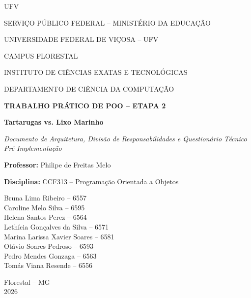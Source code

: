 \documentclass[11pt,a4paper]{article}
\begin{document}
\begin{titlepage}
  \centering
  \vspace*{0.2cm}
  {\fontsize{38}{42}\selectfont\sffamily U\textcolor{ufvred}{F}\textcolor{ufvyellow}{V}\par}
  \vspace{0.2cm}
  {\small SERVIÇO PÚBLICO FEDERAL -- MINISTÉRIO DA EDUCAÇÃO\par}
  \vspace{0.15cm}
  {\small UNIVERSIDADE FEDERAL DE VIÇOSA -- UFV\par}
  \vspace{0.15cm}
  {\small CAMPUS FLORESTAL\par}
  \vspace{0.2cm}
  {\small INSTITUTO DE CIÊNCIAS EXATAS E TECNOLÓGICAS\par}
  \vspace{0.15cm}
  {\small DEPARTAMENTO DE CIÊNCIA DA COMPUTAÇÃO\par}
  \vspace{2.8cm}

  {\Large\bfseries\color{darkblue} TRABALHO PRÁTICO DE POO -- ETAPA 2\par}
  \vspace{0.3cm}
  {\LARGE\bfseries Tartarugas vs. Lixo Marinho\par}
  \vspace{0.2cm}
  {\large\textit{Documento de Arquitetura, Divisão de Responsabilidades e Questionário Técnico Pré-Implementação}\par}
  \vspace{0.8cm}

  {\normalsize\textbf{Professor:} Philipe de Freitas Melo\par}
  \vspace{0.15cm}
  {\normalsize\textbf{Disciplina:} CCF313 -- Programação Orientada a Objetos\par}
  \vspace{2.2cm}

  \begin{flushright}
    \small
    Bruna Lima Ribeiro -- 6557\\[2pt]
    Caroline Melo Silva -- 6595\\[2pt]
    Helena Santos Perez -- 6564\\[2pt]
    Lethícia Gonçalves da Silva -- 6571\\[2pt]
    Marina Larissa Xavier Soares -- 6581\\[2pt]
    Otávio Soares Pedroso -- 6593\\[2pt]
    Pedro Mendes Gonzaga -- 6563\\[2pt]
    Tomás Viana Resende -- 6556\\[2pt]
  \end{flushright}

  \vfill
  {\normalsize Florestal -- MG}\\[3pt]
  {\normalsize 2026}
\end{titlepage}
\end{document}
